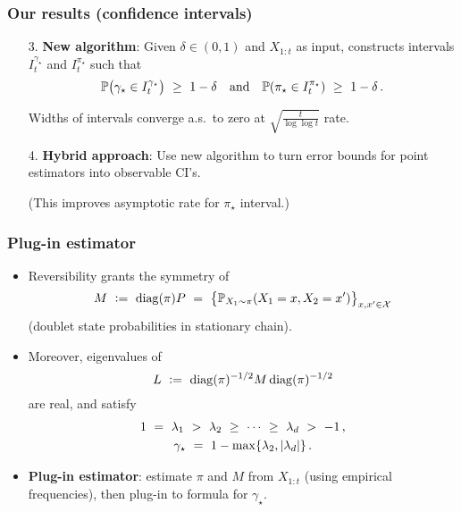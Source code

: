 \documentclass[11pt,compress,blue4]{beamer}
\newcommand\fns\footnotesize
\newcommand\pimin{\ensuremath{\pi_{\star}}}
\newcommand\gap{\ensuremath{\gamma_{\star}}}
\newcommand\states{\ensuremath{\mathcal{X}}}
\begin{document}
\begin{frame}
  \frametitle{Our results (confidence intervals)}

  \begin{enumerate}
    \item[3.]
      \textbf{New algorithm}:
      Given $\delta \in (0,1)$ and $X_{1:t}$ as input, constructs
      intervals $I_t^{\gap}$ and $I_t^{\pimin}$ such that
      \[
        \P\Parens{
          \gap \in I_t^{\gap}
        }
        \ \geq \ 1-\delta
        \quad
        \text{and}
        \quad
        \P\Parens{
          \pimin \in I_t^{\pimin}
        }
        \ \geq \ 1-\delta
        \,.
      \]

      Widths of intervals converge a.s.~to zero at
      $\sqrt{\frac{t}{\log\log t}}$ rate.

      \medskip

    \item[4.]
      \textbf{Hybrid approach}:
      Use new algorithm to turn error bounds for point estimators into
      observable CI's.

      {\fns(This improves asymptotic rate for $\pimin$ interval.)}

  \end{enumerate}

\end{frame}


\begin{frame}
  \frametitle{Plug-in estimator}

  \begin{itemize}
    \item
      Reversibility grants the symmetry of
      \[
        M
        \ := \
        \diag(\pi) P
        \ = \
        \Braces{ \P_{X_1 \sim \pi}(X_1=x,X_2=x') }_{x,x'\in\states}
      \]
      {\fns(doublet state probabilities in stationary chain)}.

      \smallskip

    \item
      Moreover, eigenvalues of
      \[
        L
        \ := \
        \operatorname{diag}(\pi)^{-1/2} M \operatorname{diag}(\pi)^{-1/2}
      \]
      are real, and satisfy
      \begin{gather*}
        1
        \ = \ \lambda_1 \ > \ \lambda_2 \ \geq \ \dotsb \ \geq \
        \lambda_d \ > \ -1
        \,,
        \\
        \gap
        \ = \ 1 - \max\braces{ \lambda_2, \abs{\lambda_d} }
        \,.
      \end{gather*}

      \smallskip

    \item
      \textbf{Plug-in estimator}:
      estimate $\pi$ and $M$ from $X_{1:t}$ (using empirical
      frequencies), then plug-in to formula for $\gap$.

  \end{itemize}

\end{frame}
\end{document}
